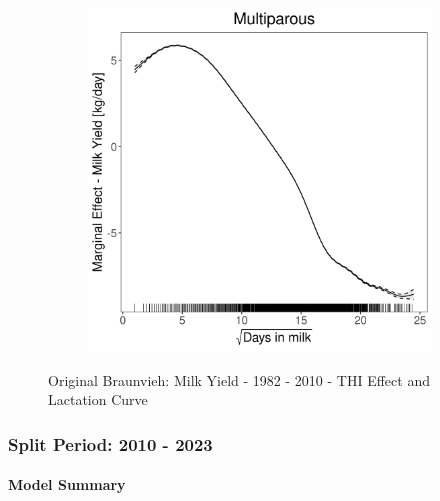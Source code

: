 \begin{figure}[H]
\begin{subfigure}[b]{0.45\textwidth}
    \end{subfigure}
    \hspace{0.05\textwidth} %
    \begin{subfigure}[b]{0.45\textwidth}
        \centering
        \includegraphics[width=\textwidth]{thesis/figures/models/milk/before2010/ob_milk_before2010/ob_milk_before2010_marginal_dim_milk_multi.png}
    \end{subfigure}
    \caption[]{Original Braunvieh: Milk Yield - 1982 - 2010 - THI Effect and Lactation Curve}
    \label{fig:main}
\end{figure}

\subsubsection{Split Period: 2010 - 2023}\label{model:ob_milk_after}

\paragraph{Model Summary} \quad \\



